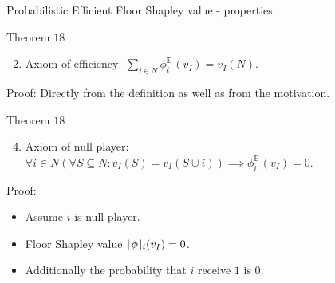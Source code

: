 \documentclass{beamer}
\newcommand{\floor}[1]{\left\lfloor #1 \right\rfloor}
\newcommand{\floorphi}{\ensuremath{\floor{\phi}\hspace{-0.5ex}}}
\DeclareMathOperator{\E}{\mathbb{E}\,}
\begin{document}


\begin{frame}{Probabilistic Efficient Floor Shapley value - properties}
    \begin{block}{Theorem $18$}
        \begin{enumerate}
            \setcounter{enumi}{1}
            \item Axiom of efficiency: $\sum_{i \in N}\phi_{i}^{\E}(v_I) = v_I(N)$.
        \end{enumerate}
    \end{block}
    Proof: Directly from the definition as well as from the motivation.

    \begin{block}{Theorem $18$}
        \begin{enumerate}
            \setcounter{enumi}{3}
            \item Axiom of null player: $\forall i \in N(\forall S \subseteq N: v_I(S)=v_I(S \cup i)) \implies \phi_{i}^{\E}(v_I) = 0$.
        \end{enumerate}
    \end{block}
    Proof:
    \begin{itemize}
        \item Assume $i$ is null player.
        \item Floor Shapley value $\floorphi_i(v_I) = 0$.
        \item Additionally the probability that $i$ receive $1$ is $0$.
    \end{itemize}

\end{frame}


\end{document}
